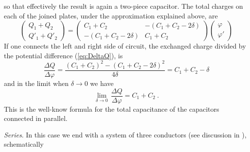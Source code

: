 \documentclass[12pt]{iopart}
\newcommand{\bc}{\begin{center}}
\newcommand{\ec}{\end{center}}
\newcommand{\be}{\begin{equation}}
\newcommand{\ee}{\end{equation}}
\newcommand{\0}{\vct{0}}
\theoremstyle{plain} \newtheorem{tm}{Theorem}[section]
\theoremstyle{plain} \newtheorem{lm}[tm]{Lemma}
\theoremstyle{definition} \newtheorem{defn}[tm]{Definition}
\begin{document}
\medskip

\noindent
so that effectively the result is again a two-piece capacitor. The total charges on each of the joined plates, under the approximation explained above, are
\be
\begin{pmatrix} Q_1 + Q_2 \\ Q'_1 + Q'_2 \end{pmatrix} = \begin{pmatrix} C_1 + C_2 & -(C_1 + C_2 - 2\delta) \\ -(C_1 + C_2 - 2\delta) & C_1 + C_2 \end{pmatrix} \begin{pmatrix} \varphi \\ \varphi' \end{pmatrix}
\ee
If one connects the left and right side of circuit, the exchanged charge divided by the potential difference (\ref{eq:DeltaQ}), is
\be
\frac{\Delta Q}{\Delta\varphi} = \frac{(C_1+C_2)^2 - (C_1 + C_2 - 2\delta)^2}{4\delta} = C_1 + C_2 - \delta
\ee
and in the limit when $\delta \to 0$ we have 
\be
\lim_{\delta\to 0} \, \frac{\Delta Q}{\Delta\varphi} = C_1 + C_2 \ .
\ee
This is the well-know formula for the total capacitance of the capacitors connected in parallel. 

\medskip



\emph{Series}. In this case we end with a system of three conductors (see discussion in \cite{JS15}), schematically

\medskip

\bc
{}
\ec

\medskip
\end{document}
